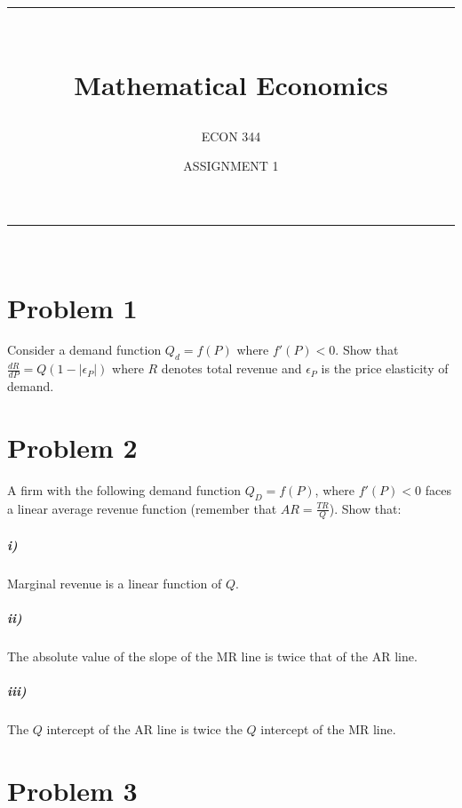 \documentclass[10pt,letter]{article}
\begin{document}

\newcommand{\horrule}[1]{\rule{\linewidth}{#1}} %

\title{  \horrule{0.5pt} \\[0.4cm] Mathematical Economics}

\author{ECON 344}

\date{ASSIGNMENT 1}


\maketitle
\horrule{2pt} \\[0.5cm] %
\section*{Problem 1}

Consider a demand function $Q_d=f(P)$ where $f'(P)<0$. Show that $ \displaystyle \frac{dR}{dP}=Q(1- \left| \epsilon_P \right|)$ where $R$ denotes total revenue and $\epsilon_P$ is the price elasticity of demand. \vspace{70mm}


\section*{Problem 2}

A firm with the following demand function $Q_D=f(P)$, where $f'(P)<0$ faces a linear average revenue function (remember that $AR=\displaystyle \frac{TR}{Q}$). Show that:

\subparagraph{i)} Marginal revenue is a linear function of $Q$.  \vspace{30mm}

\subparagraph{ii)} The absolute value of the slope of the MR line is twice that of the AR line. \vspace{30mm}

\subparagraph{iii)} The $Q$ intercept of the AR line is twice the $Q$ intercept of the MR line. \vspace{30mm}




\section*{Problem 3}
\end{document}
